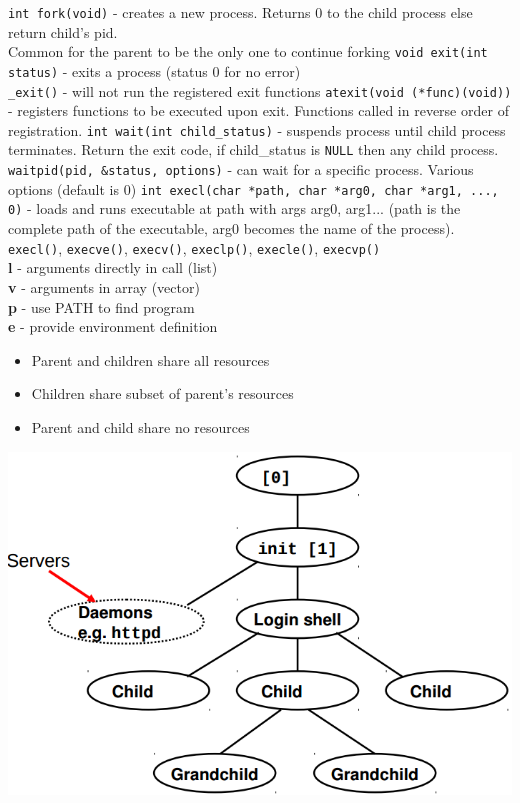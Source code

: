 \documentclass[number]{notes}
\begin{document}
\begin{landscape}
\begin{multicols}{3}
\texttt{int fork(void)} - creates a new process. Returns 0 to the child process else return child's pid.\\
Common for the parent to be the only one to continue forking
\texttt{void exit(int status)} - exits a process (status 0 for no error)\\
\texttt{\_exit()} - will not run the registered exit functions
\texttt{atexit(void (*func)(void))} - registers functions to be executed upon exit. Functions called in reverse order of registration.
\texttt{int wait(int\* child\_status)} - suspends process until child process terminates. Return the exit code, if child\_status is \texttt{NULL} then any child process.
\texttt{waitpid(pid, \&status, options)} - can wait for a specific process. Various options (default is 0)
\texttt{int execl(char *path, char *arg0, char *arg1, ..., 0)} - loads and runs executable at path with args arg0, arg1... (path is the complete path of the executable, arg0 becomes the name of the process).
\texttt{execl()}, \texttt{execve()}, \texttt{execv()}, \texttt{execlp()}, \texttt{execle()}, \texttt{execvp()}\\
\textbf{l} - arguments directly in call (list)\\
\textbf{v} - arguments in array (vector)\\
\textbf{p} - use PATH to find program\\
\textbf{e} - provide environment definition
\begin{itemize}[nolistsep]
    \item Parent and children share all resources
    \item Children share subset of parent's resources
    \item Parent and child share no resources
\end{itemize}
\includegraphics[width=.5\linewidth]{processHierarchy.png}


\end{multicols}
\end{landscape}
\end{document}
